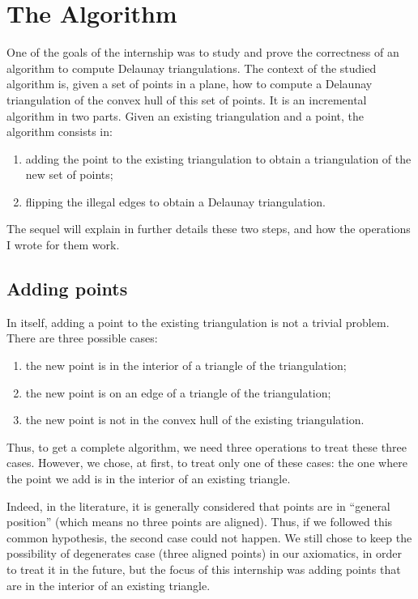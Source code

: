 \documentclass[a4paper,10pt]{article}
\begin{document}
\section{The Algorithm}
\label{algo}
One of the goals of the internship was to study and prove the correctness of an algorithm to compute Delaunay triangulations. The context of the studied algorithm is, given a set of points in a plane, how to compute a Delaunay triangulation of the convex hull of this set of points. It is an incremental algorithm in two parts. Given an existing triangulation and a point, the algorithm consists in:
\begin{enumerate}
\item adding the point to the existing triangulation to obtain a triangulation of the new set of points;
\item flipping the illegal edges to obtain a Delaunay triangulation.
\end{enumerate}

The sequel will explain in further details these two steps, and how the operations I wrote for them work.
\subsection{Adding points}
\label{step1}

In itself, adding a point to the existing triangulation is not a trivial problem.
There are three possible cases:
\begin{enumerate}
\item the new point is in the interior of a triangle of the triangulation;
\item the new point is on an edge of a triangle of the triangulation;
\item the new point is not in the convex hull of the existing triangulation.
\end{enumerate}
Thus, to get a complete algorithm, we need three operations to treat these three cases. However, we chose, at first, to treat only one of these cases: the one where the point we add is in the interior of an existing triangle.

Indeed, in the literature, it is generally considered that points are in ``general position'' (which means no three points are aligned). Thus, if we followed this common hypothesis, the second case could not happen.
We still chose to keep the possibility of degenerates case (three aligned points) in our axiomatics, in order to treat it in the future, but the focus of this internship was adding points that are in the interior of an existing triangle.
\end{document}
